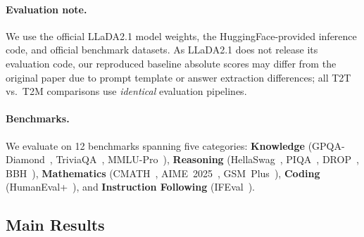 \documentclass{article}
\newcommand{\TtoT}{\textrm{T2T}}
\newcommand{\TtoM}{\textrm{T2M}}
\begin{document}
\paragraph{Evaluation note.} We use the official LLaDA2.1 model weights, the HuggingFace-provided inference code, and official benchmark datasets. As LLaDA2.1 does not release its evaluation code, our reproduced baseline absolute scores may differ from the original paper due to prompt template or answer extraction differences; all \TtoT{} vs.\ \TtoM{} comparisons use \emph{identical} evaluation pipelines.

\paragraph{Benchmarks.} We evaluate on 12 benchmarks spanning five categories: \textbf{Knowledge} (GPQA-Diamond~\citep{rein2024gpqa}, TriviaQA~\citep{joshi2017triviaqa}, MMLU-Pro~\citep{wang2024mmlu_pro}), \textbf{Reasoning} (HellaSwag~\citep{zellers2019hellaswag}, PIQA~\citep{bisk2020piqa}, DROP~\citep{dua2019drop}, BBH~\citep{suzgun2023bbh}), \textbf{Mathematics} (CMATH~\citep{wei2023cmath}, AIME~2025~\citep{aime2025}, GSM~Plus~\citep{li2024gsm_plus}), \textbf{Coding} (HumanEval+~\citep{chen2021humaneval,liu2023evalplus}), and \textbf{Instruction Following} (IFEval~\citep{zhou2023ifeval}).

\subsection{Main Results}
\end{document}
